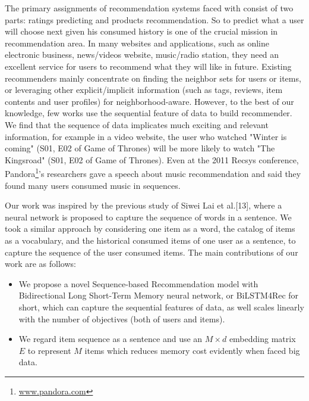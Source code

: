 \documentclass[runningheads]{llncs}
\begin{document}
The primary assignments of recommendation systems faced with consist of two parts: ratings predicting and products recommendation. So to predict what a user will choose next given his consumed history is one of the crucial mission \cite{Wan2015NextBR} in recommendation area. In many websites and applications, such as online electronic business, news/videos website, music/radio station, they need an excellent service for users to recommend what they will like in future. Existing recommenders mainly concentrate on finding the neighbor sets for users or items, or leveraging other explicit/implicit information (such as tags, reviews, item contents and user profiles) for neighborhood-aware. However, to the best of our knowledge, few works use the sequential feature of data to build recommender. We find that the sequence of data implicates much exciting and relevant information, for example in a video website, the user who watched "Winter is coming" (S01, E02 of Game of Thrones) will be more likely to watch "The Kingsroad" (S01, E02 of Game of Thrones). Even at the 2011 Recsys conference, Pandora\footnote{\url{www.pandora.com}}'s researchers gave a speech about music recommendation and said they found many users consumed music in sequences.

Our work was inspired by the previous study of Siwei Lai et al.[13], where a neural network is proposed to capture the sequence of words in a sentence.  We took a similar approach by considering one item as a word, the catalog of items as a vocabulary, and the historical consumed items of one user as a sentence, to capture the sequence of the user consumed items. The main contributions of our work are as follows:
 \begin{itemize}

\item We propose a novel Sequence-based Recommendation model with Bidirectional Long Short-Term Memory neural network,  or BiLSTM4Rec for short, which can capture the sequential features of data, as well scales linearly with the number of objectives (both of users and items).
\item We regard item sequence as a sentence and use an $M\times d$ embedding matrix $E$ to represent $M$ items which reduces memory cost evidently when faced big data.
 \end{itemize}

\end{document}
